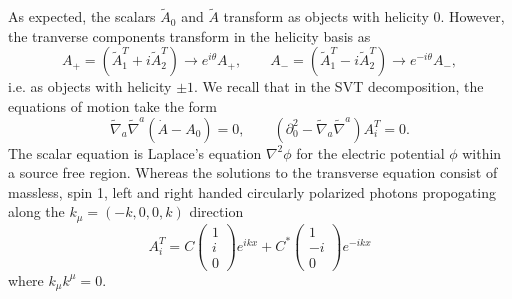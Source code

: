 \documentclass[10pt,letterpaper]{article}
\numberwithin{equation}{subsection}
\begin{document}
As expected, the scalars $\tilde A_0$ and $\tilde A$ transform as objects with helicity 0. However, the tranverse components transform in the helicity basis as
\begin{equation}
A_+ = \left(\tilde A_1^T + i\tilde A_2^T\right) \to e^{i\theta} A_+,\qquad A_- = \left(\tilde A_1^T - i\tilde A_2^T\right)\to e^{-i\theta} A_-,
\end{equation}
i.e. as objects with helicity $\pm1$. We recall that in the SVT decomposition, the equations of motion take the form
\begin{equation}
\tilde\nabla_a \tilde\nabla^a \left(\dot A - A_0\right) = 0,\qquad   \left(\partial_0^2 - \tilde\nabla_a\tilde\nabla^a\right)A_i^T=0.
\end{equation}
The scalar equation is Laplace's equation $\nabla^2\phi$ for the electric potential $\phi$ within a source free region. Whereas the solutions to the transverse equation consist of massless, spin 1, left and right handed circularly polarized photons propogating along the $k_\mu = (-k,0,0, k)$ direction
\begin{equation}
\boxed{
A_i^T = C\begin{pmatrix}1\\i\\0\end{pmatrix} e^{ikx} + C^*\begin{pmatrix}1\\-i\\0\end{pmatrix} e^{-ikx}}
\end{equation}
where $k_\mu k^\mu = 0$.
\\
\end{document}
